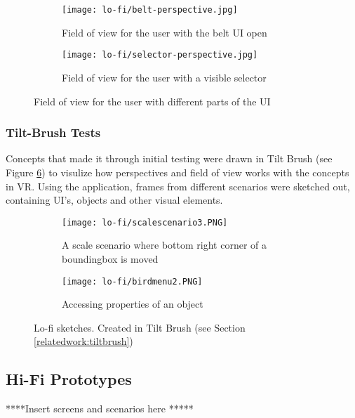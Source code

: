 
\begin{figure}
  \begin{subfigure}{.5\textwidth}
  \centering
  \texttt{[image: lo-fi/belt-perspective.jpg]}
  \caption{Field of view for the user with the belt UI open}
  \label{fig:lofi:fov:belt-ui}
  \end{subfigure}%
  \begin{subfigure}{.5\textwidth}
    \centering
    \texttt{[image: lo-fi/selector-perspective.jpg]}
    \caption{Field of view for the user with a visible selector}
    \label{fig:lofi:fov:selector}
\end{subfigure}
\caption{Field of view for the user with different parts of the UI}
\label{fig:lofi:fov}
\end{figure}


\subsubsection{Tilt-Brush Tests}
Concepts that made it through initial testing were drawn in Tilt Brush (see Figure \ref{fig:lofi:tilt})  to visulize how perspectives and field of view works with the concepts in VR. Using the application, frames from different scenarios were sketched out, containing UI's, objects and other visual elements.


\begin{figure}
\begin{subfigure}{.5\textwidth}
  \centering
  \texttt{[image: lo-fi/scalescenario3.PNG]}
  \caption{A scale scenario where bottom right corner of a boundingbox is moved}
  \label{fig:lofi:tilt:scale3}
\end{subfigure}%
\begin{subfigure}{.5\textwidth}
  \centering
  \texttt{[image: lo-fi/birdmenu2.PNG]}
  \caption{Accessing properties of an object}
  \label{fig:lofi:tilt:passivemenu}
\end{subfigure}
\caption{Lo-fi sketches. Created in Tilt Brush (see Section \ref{relatedwork:tiltbrush})}
\label{fig:lofi:tilt}
\end{figure}

\subsection{Hi-Fi Prototypes}
****Insert screens and scenarios here *****
